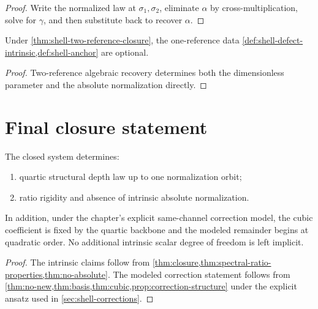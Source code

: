 \begin{proof}
Write the normalized law at \(\sigma_1,\sigma_2\), eliminate \(\alpha\) by
cross-multiplication, solve for \(\gamma\), and then substitute back to
recover \(\alpha\).
\end{proof}

\begin{corollary}
\label{cor:shell-two-reference-discharges}
Under \cref{thm:shell-two-reference-closure}, the one-reference data
\cref{def:shell-defect-intrinsic,def:shell-anchor} are optional.
\end{corollary}

\begin{proof}
Two-reference algebraic recovery determines both the dimensionless parameter
and the absolute normalization directly.
\end{proof}

\section{Final closure statement}
\label{sec:shell-summary}

\begin{theorem}
\label{thm:final}
The closed system determines:
\begin{enumerate}[label=\textup{(\roman*)}]
\item quartic structural depth law up to one normalization orbit;
\item ratio rigidity and absence of intrinsic absolute normalization.
\end{enumerate}
In addition, under the chapter's explicit same-channel correction
model, the cubic coefficient is fixed by the quartic backbone and the
modeled remainder begins at quadratic order.
No additional intrinsic scalar degree of freedom is left implicit.
\end{theorem}

\begin{proof}
The intrinsic claims follow from
\cref{thm:closure,thm:spectral-ratio-properties,thm:no-absolute}.
The modeled correction statement follows from
\cref{thm:no-new,thm:basis,thm:cubic,prop:correction-structure}
under the explicit ansatz used in
\cref{sec:shell-corrections}.
\end{proof}

